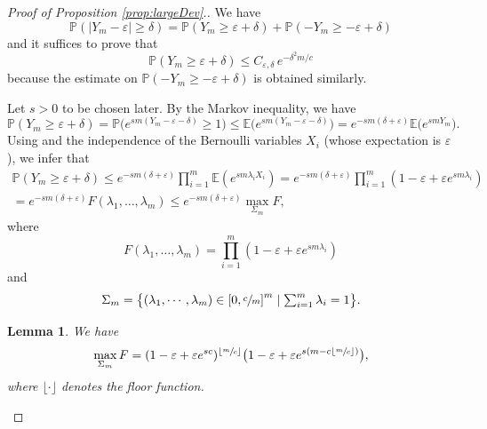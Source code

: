 \documentclass[JEP,XML,SOM,Unicode, NoEqCountersInSection,NoFloatCountersInSection,published]{cedram}
\newtheorem{lemma}{Lemma}
\theoremstyle{definition}
\begin{document}
\begin{proof}[Proof of Proposition \ref{prop:largeDev}.]
We have
\[
\mathbb{P}( |Y_m - \varepsilon| \geq \delta) =\mathbb{P}\left(Y_m \geq \varepsilon + \delta\right)+\mathbb{P} \left( -Y_m \geq -\varepsilon + \delta\right)
\]
and it suffices to prove that
\[
\mathbb{P}( Y_m \geq \varepsilon + \delta) \leq C_{\varepsilon,\delta}\, e^{-\delta^2 m/c}
\]
because the estimate on $\mathbb{P} \left( -Y_m \geq -\varepsilon + \delta\right)$ is obtained similarly.

Let $s>0$ to be chosen later. By the Markov inequality, we have
\[
\mathbb{P}( Y_m \geq \varepsilon + \delta) = \mathbb{P} \bigl(e^{sm (Y_m - \varepsilon - \delta)} \geq 1\bigr)
\leq \mathbb{E}\bigl( e^{sm (Y_m - \varepsilon - \delta)}\bigr) = e^{-sm(\delta + \varepsilon)} \mathbb{E}\bigl( e^{sm Y_m} \bigr).
\]
Using and the independence of the Bernoulli variables $X_i$ (whose expectation is $\varepsilon$), we infer that
\begin{multline} \label{ineqwithF}
\mathbb{P}( Y_m \geq \varepsilon + \delta) \leq e^{-s m(\delta + \varepsilon)} \prod_{i=1}^{m} \mathbb{E}\left( e^{sm \lambda_i X_i } \right) = e^{-s m(\delta + \varepsilon)} \prod_{i=1}^{m} \left( 1-\varepsilon + \varepsilon e^{sm\lambda_i} \right) \\
= e^{-s m(\delta + \varepsilon)} F(\lambda_{1} , \dots, \lambda_{m} )
\leq e^{-s m(\delta + \varepsilon)} \max_{\Sigma_m}F,
\end{multline}
where
\[
F (\lambda_1,\dots,\lambda_m) = \prod_{i=1}^{m} \left( 1-\varepsilon + \varepsilon e^{sm \lambda_{i}} \right)
\]
and
\[\textstyle
\Sigma_m = \bigl\{ (\lambda_1,\cdots,\lambda_m) \in \left[0,\sfrac{c}{m}\right]^m \mid \sum_{i=1}^m \lambda_i = 1 \bigr\}.
\]

\begin{lemma}\label{lem:auxRes}
We have
\[
\max_{\Sigma_m}F=(1-\varepsilon+\varepsilon e^{sc})^{\left \lfloor{\sfrac{m}{c}}\right \rfloor}\bigl(1-\varepsilon+\varepsilon e^{s\left(m-c\left \lfloor{\sfrac{m}{c}}\right \rfloor\right)}\bigr),
\]
where $\lfloor \cdot \rfloor$ denotes the floor function.
\end{lemma}


\end{proof}
\end{document}
